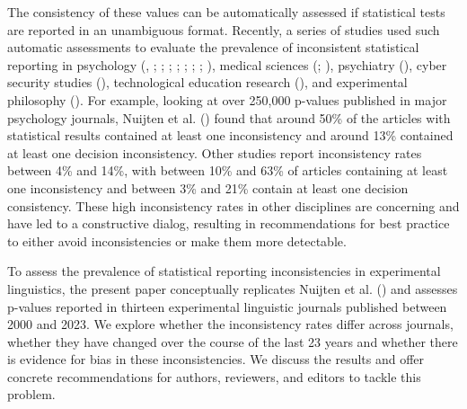 \documentclass[
  doc,
  longtable,
  nolmodern,
  notxfonts,
  notimes,
  colorlinks=true,linkcolor=blue,citecolor=blue,urlcolor=blue]{apa7}
\begin{document}
The consistency of these values can be automatically assessed if
statistical tests are reported in an unambiguous format. Recently, a
series of studies used such automatic assessments to evaluate the
prevalence of inconsistent statistical reporting in psychology
(,
;
;
;
;
;
;
;
), medical
sciences (; ),
psychiatry (), cyber security studies (), technological education research
(), and
experimental philosophy (). For example, looking at over 250,000 p-values published
in major psychology journals, Nuijten et al.
() found that around 50\% of
the articles with statistical results contained at least one
inconsistency and around 13\% contained at least one decision
inconsistency. Other studies report inconsistency rates between 4\% and
14\%, with between 10\% and 63\% of articles containing at least one
inconsistency and between 3\% and 21\% contain at least one decision
consistency. These high inconsistency rates in other disciplines are
concerning and have led to a constructive dialog, resulting in
recommendations for best practice to either avoid inconsistencies or
make them more detectable.

To assess the prevalence of statistical reporting inconsistencies in
experimental linguistics, the present paper conceptually replicates
Nuijten et al. () and assesses
p-values reported in thirteen experimental linguistic journals published
between 2000 and 2023. We explore whether the inconsistency rates differ
across journals, whether they have changed over the course of the last
23 years and whether there is evidence for bias in these
inconsistencies. We discuss the results and offer concrete
recommendations for authors, reviewers, and editors to tackle this
problem.
\end{document}
